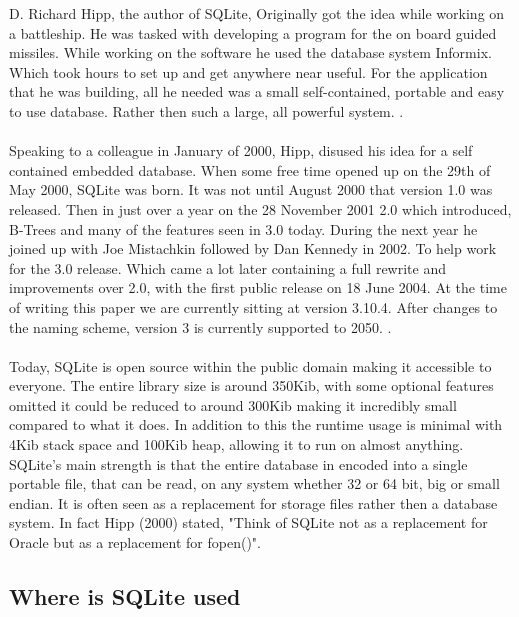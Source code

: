 D. Richard Hipp, the author of SQLite, Originally got the idea while working on a battleship. He was tasked with developing a program for the on board guided missiles. While working on the software he used the database system Informix. Which took hours to set up and get anywhere near useful. For the application that he was building, all he needed was a small self-contained, portable and easy to use database. Rather then such a large, all powerful system. \citep{sqlitedefguide}.
\\\\
Speaking to a colleague in January of 2000, Hipp, disused his idea for a self contained embedded database. When some free time opened up on the 29th of May 2000, SQLite was born. It was not until August 2000 that version 1.0 was released. Then in just over a year on the 28 November 2001 2.0 which introduced, B-Trees and many of the features seen in 3.0 today. During the next year he joined up with Joe Mistachkin followed by Dan Kennedy in 2002. To help work for the 3.0 release. Which came a lot later containing a full rewrite and improvements over 2.0, with the first public release on 18 June 2004. At the time of writing this paper we are currently sitting at version 3.10.4. After changes to the naming scheme, version 3 is currently supported to 2050. \citep{sqlite}.
\\\\
Today, SQLite is open source within the public domain making it accessible to everyone. The entire library size is around 350Kib, with some optional features omitted it could be reduced to around 300Kib making it incredibly small compared to what it does. In addition to this the runtime usage is minimal with 4Kib stack space and 100Kib heap, allowing it to run on almost anything. SQLite's main strength is that the entire database in encoded into a single portable file, that can be read, on any system whether 32 or 64 bit, big or small endian. It is often seen as a replacement for storage files rather then a database system. In fact Hipp (2000) stated, "Think of SQLite not as a replacement for Oracle but as a replacement for fopen()".

\subsection{Where is SQLite used}
\label{subsec:where_is_sqlite}

